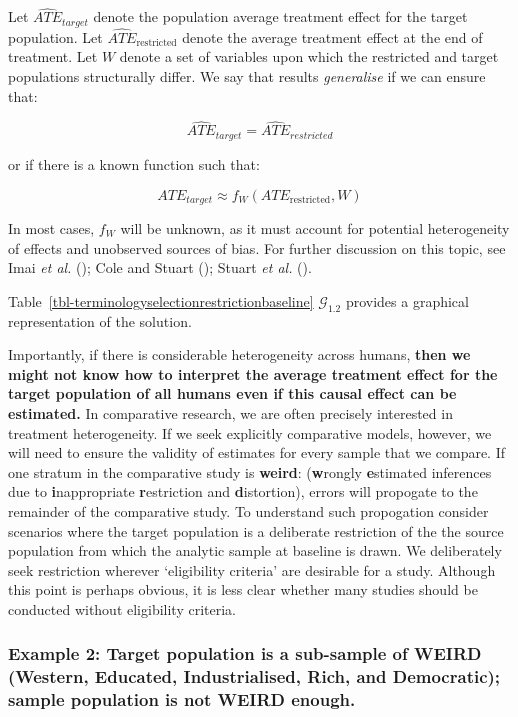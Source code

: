 \documentclass[
  single column]{article}
\begin{document}
Let \(\widehat{ATE}_{target}\) denote the population average treatment
effect for the target population. Let
\(\widehat{ATE}_{\text{restricted}}\) denote the average treatment
effect at the end of treatment. Let \(W\) denote a set of variables upon
which the restricted and target populations structurally differ. We say
that results \emph{generalise} if we can ensure that:

\[
\widehat{ATE}_{target} = \widehat{ATE}_{restricted}
\]

or if there is a known function such that:

\[
ATE_{target} \approx f_W(ATE_{\text{restricted}}, W)
\]

In most cases, \(f_W\) will be unknown, as it must account for potential
heterogeneity of effects and unobserved sources of bias. For further
discussion on this topic, see Imai \emph{et al.}
(); Cole and Stuart
(); Stuart \emph{et al.}
().

Table~\ref{tbl-terminologyselectionrestrictionbaseline}
\(\mathcal{G}_{1.2}\) provides a graphical representation of the
solution.

Importantly, if there is considerable heterogeneity across humans,
\textbf{then we might not know how to interpret the average treatment
effect for the target population of all humans even if this causal
effect can be estimated.} In comparative research, we are often
precisely interested in treatment heterogeneity. If we seek explicitly
comparative models, however, we will need to ensure the validity of
estimates for every sample that we compare. If one stratum in the
comparative study is \textbf{weird}: (\textbf{w}rongly
\textbf{e}stimated inferences due to \textbf{i}nappropriate
\textbf{r}estriction and \textbf{d}istortion), errors will propogate to
the remainder of the comparative study. To understand such propogation
consider scenarios where the target population is a deliberate
restriction of the the source population from which the analytic sample
at baseline is drawn. We deliberately seek restriction wherever
`eligibility criteria' are desirable for a study. Although this point is
perhaps obvious, it is less clear whether many studies should be
conducted without eligibility criteria.

\subsubsection{Example 2: Target population is a sub-sample of WEIRD
(Western, Educated, Industrialised, Rich, and Democratic); sample
population is not WEIRD
enough.}\label{example-2-target-population-is-a-sub-sample-of-weird-western-educated-industrialised-rich-and-democratic-sample-population-is-not-weird-enough.}
\end{document}
